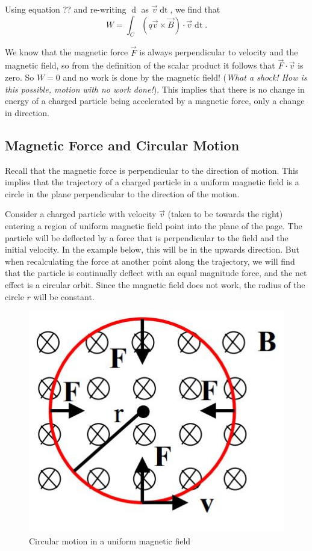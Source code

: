 Using equation ?? and re-writing $\mathop{\mathrm{d}\vec{s}}$ as $\vec{v}\mathop{\mathrm{d}t}$, we find that
\begin{equation}
    W = \int_C (q\vec{v} \times \vec{B}) \cdot \vec{v} \mathop{\mathrm{d}t}.
\end{equation}

We know that the magnetic force $\vec{F}$ is always perpendicular to velocity and the magnetic field, so from the definition of the scalar product it follows that $\vec{F} \cdot \vec{v}$ is zero. So $W = 0$ and no work is done by the magnetic field! (\textit{What a shock! How is this possible, motion with no work done!}). This implies that there is no change in energy of a charged particle being accelerated by a magnetic force, only a change in direction. 

\subsection{Magnetic Force and Circular Motion}

Recall that the magnetic force is perpendicular to the direction of motion. This implies that the trajectory of a charged particle in a uniform magnetic field is a circle in the plane perpendicular to the direction of the motion. 

Consider a charged particle with velocity $\vec{v}$ (taken to be towards the right) entering a region of uniform magnetic field point into the plane of the page. The particle will be deflected by a force that is perpendicular to the field and the initial velocity. In the example below, this will be in the upwards direction. But when recalculating the force at another point along the trajectory, we will find that the particle is continually deflect with an equal magnitude force, and the net effect is a circular orbit. Since the magnetic field does not work, the radius of the circle $r$ will be constant.

\begin{figure}[h!]
    \centering
    \includegraphics[scale=0.6]{notes/images/Magnetism-CM.JPG}
    \caption{Circular motion in a uniform magnetic field}
\end{figure}
\FloatBarrier

